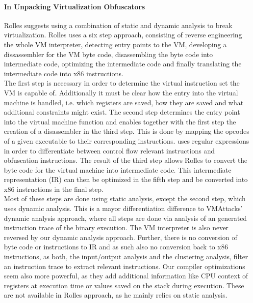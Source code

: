 \documentclass[10pt,twoside,a4paper,bibliography=totoc]{scrbook}
\begin{document}
\paragraph*{In Unpacking Virtualization Obfuscators} Rolles suggests using a combination of static and dynamic analysis to break virtualization. 
\cite{Rolles:2009:UVO:1855876.1855877} Rolles uses a six step approach, consisting of reverse engineering the whole VM interpreter, detecting entry points to the VM, developing a dissassembler for the VM byte code, disassembling the byte code into intermediate code, optimizing the intermediate code and finally translating the intermediate code into x86 instructions.\\
The first step is necessary in order to determine the virtual instruction set the VM is capable of. Additionally it must be clear how the entry into the virtual machine is handled, i.e. which registers are saved, how they are saved and what additional constraints might exist. 
The second step determines the entry point into the virtual machine function and enables together with the first step the creation of a disassembler in the third step. This is done by mapping the opcodes of a given executable to their corresponding instructions. \cite{Rolles:2009:UVO:1855876.1855877} uses regular expressions in order to differentiate between control flow relevant instructions and obfuscation instructions.
The result of the third step allows Rolles to convert the byte code for the virtual machine into intermediate code. This intermediate representation (IR) can then be optimized in the fifth step and be converted into x86 instructions in the final step. \\
Most of these steps are done using static analysis, except the second step, which uses dynamic analysis. 
This is a mayor differentiation difference to VMAttacks' dynamic analysis approach, where all steps are done via analysis of an generated instruction trace of the binary execution.
The VM interpreter is also never reversed by our dynamic analysis approach. Further, there is no conversion of byte code or instructions to IR and as such also no conversion back to x86 instructions, as both, the input/output analysis and the clustering analysis, filter an instruction trace to extract relevant instructions.
Our compiler optimizations seem also more powerful, as they add additional information like CPU context of registers at execution time or values saved on the stack during execution. These are not available in Rolles approach, as he mainly relies on static analysis. \\
\end{document}
